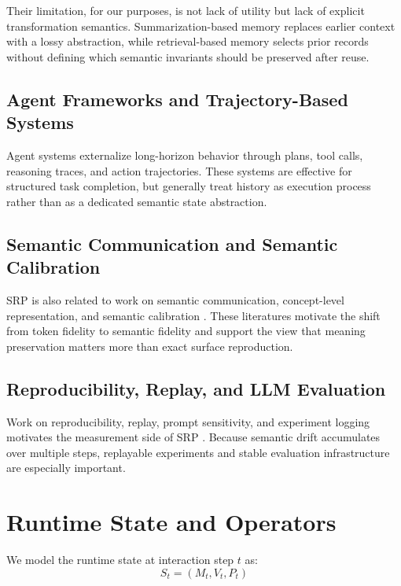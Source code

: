 \documentclass[11pt]{article}
\begin{document}
Their limitation, for our purposes, is not lack of utility but lack of explicit transformation semantics. Summarization-based memory replaces earlier context with a lossy abstraction, while retrieval-based memory selects prior records without defining which semantic invariants should be preserved after reuse.

\subsection{Agent Frameworks and Trajectory-Based Systems}
Agent systems externalize long-horizon behavior through plans, tool calls, reasoning traces, and action trajectories. These systems are effective for structured task completion, but generally treat history as execution process rather than as a dedicated semantic state abstraction.

\subsection{Semantic Communication and Semantic Calibration}
SRP is also related to work on semantic communication, concept-level representation, and semantic calibration \citep{guo2024semanticnetworks,survey2025semanticcommunications,survey2025securesemantic}. These literatures motivate the shift from token fidelity to semantic fidelity and support the view that meaning preservation matters more than exact surface reproduction.

\subsection{Reproducibility, Replay, and LLM Evaluation}
Work on reproducibility, replay, prompt sensitivity, and experiment logging motivates the measurement side of SRP \citep{promptsensitivity2023,benchmarkingpromptsensitivity2025,assessingreproducibility2025,reproducibilityml2024,towardstrainingreproducible2022,reproducibilitygeneralizability2024}. Because semantic drift accumulates over multiple steps, replayable experiments and stable evaluation infrastructure are especially important.

\section{Runtime State and Operators}
We model the runtime state at interaction step $t$ as:
\begin{equation}
S_t = (M_t, V_t, P_t)
\end{equation}
\end{document}
